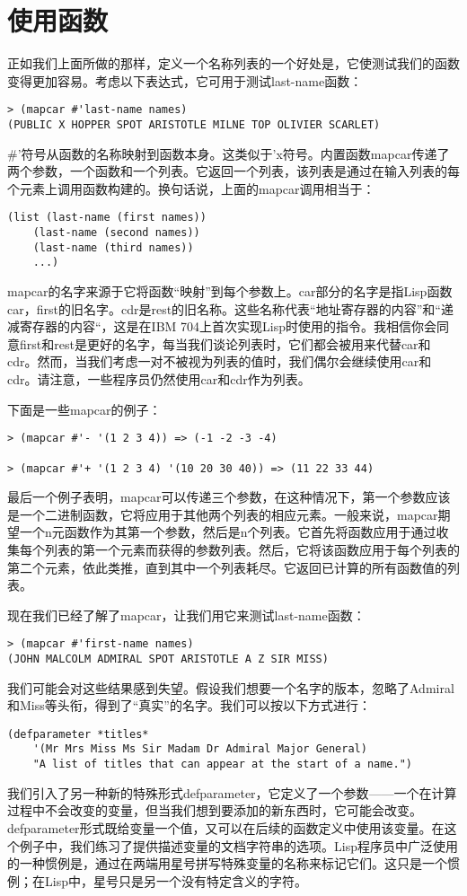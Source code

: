 \section{使用函数}
正如我们上面所做的那样，定义一个名称列表的一个好处是，它使测试我们的函数变得更加容易。考虑以下表达式，它可用于测试last-name函数：

\begin{lstlisting}[frame=shadowbox]
> (mapcar #'last-name names)
(PUBLIC X HOPPER SPOT ARISTOTLE MILNE TOP OLIVIER SCARLET)
\end{lstlisting}
\#'符号从函数的名称映射到函数本身。这类似于'x符号。内置函数mapcar传递了两个参数，一个函数和一个列表。它返回一个列表，该列表是通过在输入列表的每个元素上调用函数构建的。换句话说，上面的mapcar调用相当于：
\begin{lstlisting}[frame=shadowbox]
(list (last-name (first names))
	(last-name (second names))
	(last-name (third names))
	...)
\end{lstlisting}
mapcar的名字来源于它将函数“映射”到每个参数上。car部分的名字是指Lisp函数car，first的旧名字。cdr是rest的旧名称。这些名称代表“地址寄存器的内容”和“递减寄存器的内容“，这是在IBM 704上首次实现Lisp时使用的指令。我相信你会同意first和rest是更好的名字，每当我们谈论列表时，它们都会被用来代替car和cdr。然而，当我们考虑一对不被视为列表的值时，我们偶尔会继续使用car和cdr。请注意，一些程序员仍然使用car和cdr作为列表。

下面是一些mapcar的例子：
\begin{lstlisting}[frame=shadowbox]
> (mapcar #'- '(1 2 3 4)) => (-1 -2 -3 -4)

> (mapcar #'+ '(1 2 3 4) '(10 20 30 40)) => (11 22 33 44)
\end{lstlisting}
最后一个例子表明，mapcar可以传递三个参数，在这种情况下，第一个参数应该是一个二进制函数，它将应用于其他两个列表的相应元素。一般来说，mapcar期望一个n元函数作为其第一个参数，然后是n个列表。它首先将函数应用于通过收集每个列表的第一个元素而获得的参数列表。然后，它将该函数应用于每个列表的第二个元素，依此类推，直到其中一个列表耗尽。它返回已计算的所有函数值的列表。

现在我们已经了解了mapcar，让我们用它来测试last-name函数：
\begin{lstlisting}[frame=shadowbox]
> (mapcar #'first-name names)
(JOHN MALCOLM ADMIRAL SPOT ARISTOTLE A Z SIR MISS)
\end{lstlisting}

我们可能会对这些结果感到失望。假设我们想要一个名字的版本，忽略了Admiral和Miss等头衔，得到了“真实”的名字。我们可以按以下方式进行：
\begin{lstlisting}[frame=shadowbox]
(defparameter *titles*
	'(Mr Mrs Miss Ms Sir Madam Dr Admiral Major General)
	"A list of titles that can appear at the start of a name.")
\end{lstlisting}
我们引入了另一种新的特殊形式defparameter，它定义了一个参数——一个在计算过程中不会改变的变量，但当我们想到要添加的新东西时，它可能会改变。defparameter形式既给变量一个值，又可以在后续的函数定义中使用该变量。在这个例子中，我们练习了提供描述变量的文档字符串的选项。Lisp程序员中广泛使用的一种惯例是，通过在两端用星号拼写特殊变量的名称来标记它们。这只是一个惯例；在Lisp中，星号只是另一个没有特定含义的字符。

